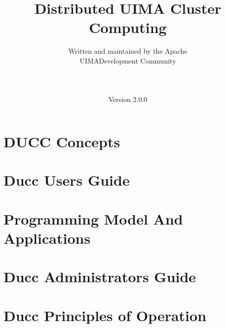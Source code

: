 \documentclass[oneside]{book}
\title{\Huge \textbf{Distributed UIMA Cluster Computing}}
\author{Written and maintained by the Apache\\
UIMA\texttrademark Development Community \\
\\
\\
\\
Version 2.0.0}
\date{}
\begin{document}
\frontmatter
\maketitle



\renewcommand\contentsname{Table of Contents}
\tableofcontents
\listoffigures

\mainmatter



\part{DUCC Concepts}



\part{Ducc Users Guide}


\part{Programming Model And Applications}


\part{Ducc Administrators Guide}


\part{Ducc Principles of Operation}

\end{document}

